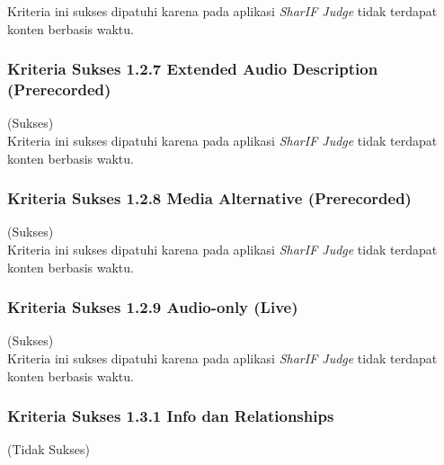 \documentclass[a4paper,twoside]{article}
\begin{document}
\begin{enumerate}
		Kriteria ini sukses dipatuhi karena pada aplikasi \textit{SharIF Judge} tidak terdapat konten berbasis waktu.
		
		\subsubsection*{Kriteria Sukses 1.2.7 Extended Audio Description (Prerecorded)}
		\label{subsubsec:kepatuhan_kriteria_1.2.7}
		(Sukses) \\
		
		Kriteria ini sukses dipatuhi karena pada aplikasi \textit{SharIF Judge} tidak terdapat konten berbasis waktu.
		
		\subsubsection*{Kriteria Sukses 1.2.8 Media Alternative (Prerecorded)}
		\label{subsubsec:kepatuhan_kriteria_1.2.8}
		(Sukses) \\
		
		Kriteria ini sukses dipatuhi karena pada aplikasi \textit{SharIF Judge} tidak terdapat konten berbasis waktu.
		
		\subsubsection*{Kriteria Sukses 1.2.9 Audio-only (Live)}
		\label{subsubsec:kepatuhan_kriteria_1.2.9}
		(Sukses) \\
		
		Kriteria ini sukses dipatuhi karena pada aplikasi \textit{SharIF Judge} tidak terdapat konten berbasis waktu.
		
		\subsubsection*{Kriteria Sukses 1.3.1 Info dan Relationships}
		\label{subsubsec:kepatuhan_kriteria_1.3.1}
		(Tidak Sukses) \\
		

\end{enumerate}
\end{document}
